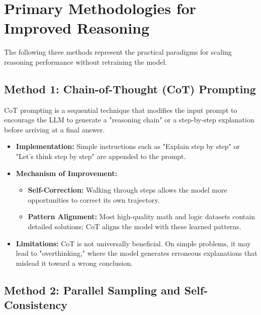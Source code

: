 ﻿\section{Primary Methodologies for Improved Reasoning}
\label{sec:experiments-and-implementation}


The following three methods represent the practical paradigms for scaling reasoning performance without retraining the model.

\subsection{Method 1: Chain-of-Thought (CoT) Prompting}

CoT prompting is a sequential technique that modifies the input prompt to encourage the LLM to generate a "reasoning chain" or a step-by-step explanation before arriving at a final answer.

\begin{itemize}
  \item \textbf{Implementation:} Simple instructions such as "Explain step by step" or "Let's think step by step" are appended to the prompt.
  \item \textbf{Mechanism of Improvement:}
  \begin{itemize}
    \item \textbf{Self-Correction:} Walking through steps allows the model more opportunities to correct its own trajectory.
    \item \textbf{Pattern Alignment:} Most high-quality math and logic datasets contain detailed solutions; CoT aligns the model with these learned patterns.
  \end{itemize}
  \item \textbf{Limitations:} CoT is not universally beneficial. On simple problems, it may lead to "overthinking," where the model generates erroneous explanations that mislead it toward a wrong conclusion.
\end{itemize}

\subsection{Method 2: Parallel Sampling and Self-Consistency}

